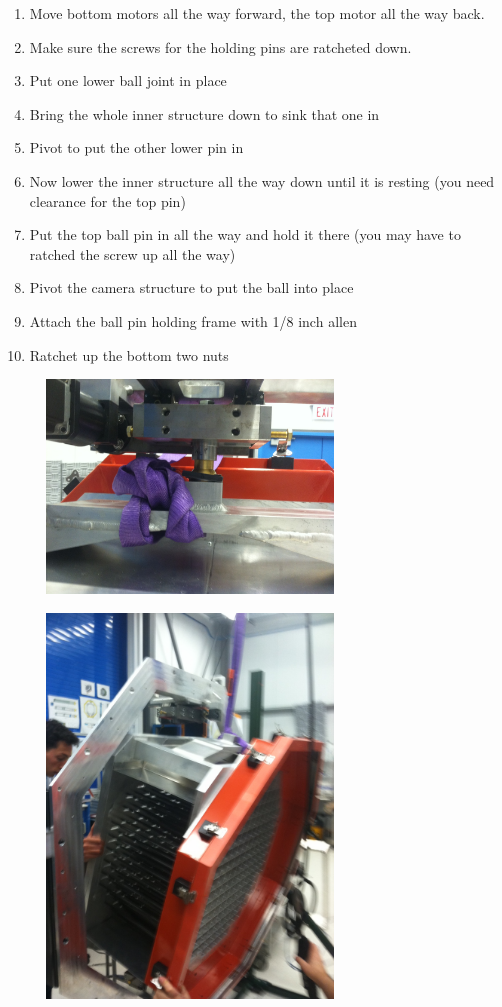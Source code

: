 \documentclass[11pt]{article}
\begin{document}
\begin{enumerate}
\item Move bottom motors all the way forward, the top motor all the way back.
\item Make sure the screws for the holding pins are ratcheted down.
\item Put one lower ball joint in place
\item Bring the whole inner structure down to sink that one in
\item Pivot to put the other lower pin in
\item Now lower the inner structure all the way down until it is resting (you need clearance for the top pin)
\item Put the top ball pin in all the way and hold it there (you may have to ratched the screw up all the way)
\item Pivot the camera structure to put the ball into place 
\item Attach the ball pin holding frame with 1/8 inch allen
\item Ratchet up the bottom two nuts
\end{enumerate}


\begin{figure}[h]
\begin{center}
\includegraphics[width = 3in]{photo_2.png}
\end{center}
\caption{}  
\label{fd1}
\end{figure}


\begin{figure}[h]
\begin{center}
\includegraphics[width = 3in]{photo_3.png}
\end{center}
\caption{}  
\label{fd2}
\end{figure}
\end{document}

